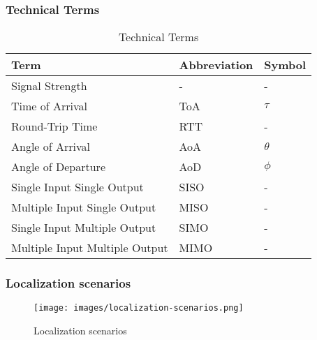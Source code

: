 \documentclass{beamer}
\begin{document}
\begin{frame}
	\frametitle{Technical Terms}
	\begin{table}[h!]
		\centering
		\begin{tabular}{lll}
			\toprule
			\textbf{Term} & \textbf{Abbreviation} & \textbf{Symbol} \\ 
			\midrule
			Signal Strength     & -                     & -               \\ 
			Time of Arrival     & ToA                   & $\tau$          \\ 
			Round-Trip Time     & RTT                   & -               \\ 
			Angle of Arrival    & AoA                   & $\theta$        \\ 
			Angle of Departure  & AoD                   & $\phi$          \\ 
			\midrule
			Single Input Single Output   & SISO                  & -               \\ 
			Multiple Input Single Output   & MISO                  & -               \\ 
			Single Input Multiple Output   & SIMO                  & -               \\ 
			Multiple Input Multiple Output   & MIMO                  & -               \\ 
			\bottomrule
		\end{tabular}
		\caption{Technical Terms}
	\end{table}
\end{frame}

\begin{frame}
	\frametitle{Localization scenarios}	

	\begin{figure}
		\centering
		\texttt{[image: images/localization-scenarios.png]}
		\caption{Localization scenarios}
		\label{fig:localization-scenarios}
	\end{figure}
\end{frame}
\end{document}
